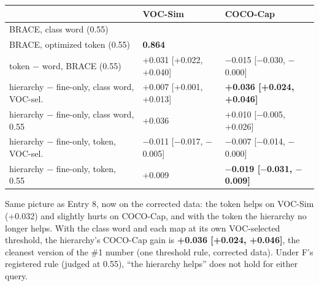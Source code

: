 \documentclass[
  10pt,
]{article}
\newcounter{none} %
\begin{document}
{\def\LTcaptype{none} %
\begin{longtable}[]{@{}
  >{\raggedright\arraybackslash}p{}
  >{\raggedright\arraybackslash}p{}
  >{\raggedright\arraybackslash}p{}@{}}
\toprule\noalign{}
\begin{minipage}[b]{\linewidth}\raggedright
\end{minipage} & \begin{minipage}[b]{\linewidth}\raggedright
VOC-Sim
\end{minipage} & \begin{minipage}[b]{\linewidth}\raggedright
COCO-Cap
\end{minipage} \\
\midrule\noalign{}
\endhead
\bottomrule\noalign{}
\endlastfoot
BRACE, class word (0.55) & 0.832 & 0.708 \\
BRACE, optimized token (0.55) & \textbf{0.864} & 0.693 \\
token \ensuremath{-} word, BRACE (0.55) & +0.031 {[}+0.022, +0.040{]} & \ensuremath{-}0.015
{[}\ensuremath{-}0.030, \ensuremath{-}0.000{]} \\
hierarchy \ensuremath{-} fine-only, class word, VOC-sel. & +0.007 {[}+0.001,
+0.013{]} & \textbf{+0.036 {[}+0.024, +0.046{]}} \\
hierarchy \ensuremath{-} fine-only, class word, 0.55 & +0.036 & +0.010 {[}\ensuremath{-}0.005,
+0.026{]} \\
hierarchy \ensuremath{-} fine-only, token, VOC-sel. & \ensuremath{-}0.011 {[}\ensuremath{-}0.017, \ensuremath{-}0.005{]} &
\ensuremath{-}0.007 {[}\ensuremath{-}0.014, \ensuremath{-}0.000{]} \\
hierarchy \ensuremath{-} fine-only, token, 0.55 & +0.009 & \textbf{\ensuremath{-}0.019 {[}\ensuremath{-}0.031,
\ensuremath{-}0.009{]}} \\
\end{longtable}
}

Same picture as Entry 8, now on the corrected data: the token helps on
VOC-Sim (+0.032) and slightly hurts on COCO-Cap, and with the token the
hierarchy no longer helps. With the class word and each map at its own
VOC-selected threshold, the hierarchy's COCO-Cap gain is \textbf{+0.036
{[}+0.024, +0.046{]}}, the cleanest version of the \#1 number (one
threshold rule, corrected data). Under F's registered rule (judged at
0.55), ``the hierarchy helps'' does not hold for either query.
\end{document}
